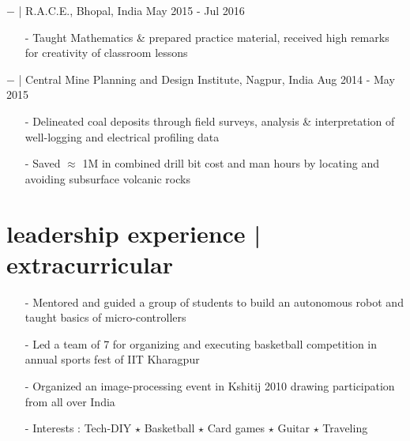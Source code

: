\documentclass[a4paper, 10pt, oneside]{article}
\newcommand{\bulltetspace}{\vspace{-0.2em}}
\begin{document}
\begin{center}
$-$ \color{headings}{Teaching Associate} | R.A.C.E., Bhopal, India \hfill May 2015 - Jul 2016
\color{text1}
\vspace{-0.3em}
\begin{itemize}
\bulltetspace
\item[-] Taught Mathematics \& prepared practice material, received high remarks for creativity of classroom lessons\\
\end{itemize}

$-$ \color{headings}{Geophysicist} | Central Mine Planning and Design Institute, Nagpur, India \hfill Aug 2014 - May 2015
\color{text1}
\vspace{-0.3em}
\begin{itemize}
\bulltetspace
\item[-] Delineated coal deposits through field surveys, analysis \& interpretation of well-logging and electrical profiling data\\ 
\bulltetspace
\item[-] Saved $\approx$ \faInr 1M in combined drill bit cost and man hours by locating and avoiding subsurface volcanic rocks\\
\bulltetspace
\end{itemize}
\end{center}

\vspace{-0.5em}
\section{\color{headings}leadership experience | extracurricular}
\color{text1}
\begin{center}
\begin{itemize}
\bulltetspace
\item[-] Mentored and guided a group of students to build an autonomous robot and taught basics of micro-controllers\\
\bulltetspace
\item[-] Led a team of 7 for organizing and executing basketball competition in annual sports fest of IIT Kharagpur\\
\bulltetspace
\item[-] Organized an image-processing event in Kshitij 2010 drawing participation from all over India\\
\bulltetspace
\item[-] Interests :  Tech-DIY $\star$ Basketball $\star$ Card games $\star$ Guitar $\star$ Traveling 

\bulltetspace
\end{itemize}
\end{center}
\vspace{-1em}
\end{document}
